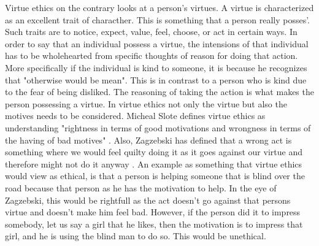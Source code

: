 Virtue ethics on the contrary looks at a person's virtues. A virtue is characterized as an excellent trait of characther. This is something that a person really posses'. Such traits are to notice, expect, value, feel, choose, or act in certain ways. In order to say that an individual possess a virtue, the intensions of that individual has to be wholehearted from specific thoughts of reason for doing that action. More specifically if the individual is kind to someone, it is because he recognizes that "otherwise would be mean". This is in contrast to a person who is kind due to the fear of being disliked. The reasoning of taking the action is what makes the person possessing a virtue. 
In virtue ethics not only the virtue but also the motives needs to be considered. Micheal Slote defines virtue ethics as understanding "rightness in terms of good motivations and wrongness in terms of the having of bad motives" \cite{slote:2001}. Also, Zagzebski has defined that a wrong act is something where we would feel quilty doing it as it goes against our virtue and therefore might not do it anyway . 
An example as something that virtue ethics would view as ethical, is that a person is helping someone that is blind over the road because that person as he has the motivation to help. In the eye of Zagzebski, this would be rightfull as the act doesn't go against that persons virtue and doesn't make him feel bad. However, if the person did it to impress somebody, let us say a girl that he likes, then the motivation is to impress that girl, and he is using the blind man to do so. This would be unethical. 
